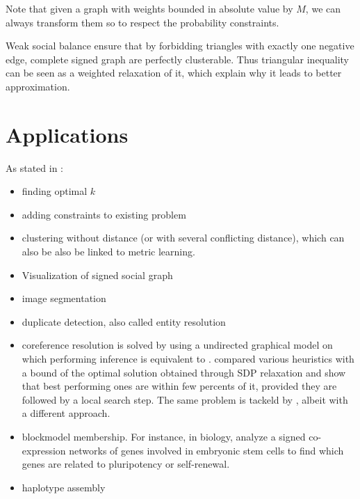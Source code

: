 Note that given a graph with weights bounded in absolute value by $M$, we can
always transform them so to respect the probability constraints.

Weak social balance ensure that by forbidding triangles with exactly one
negative edge, complete signed graph are perfectly
clusterable\autocite{davis1967clustering}. Thus triangular inequality can be
seen as a weighted relaxation of it, which explain why it leads to better
approximation.

\section{Applications}
\label{sec:appli}
As stated in \autocite[Section 5]{Demaine2006}:
\begin{itemize}
	\item finding optimal $k$
	\item adding constraints to existing problem
	\item clustering without distance (or with several conflicting
		distance), which can also be also be linked to metric learning.
	\item Visualization of signed social graph \autocite{Luca10}
	\item image segmentation \autocites{Bagon2011}{Kim2011}
	\item duplicate detection, also called entity resolution \autocite{DeDup09}
	\item coreference resolution is solved by \textcite[Section
		2.3]{graphicalCoreference04} using a undirected graphical model on
		which performing inference is equivalent to \pcc{}.
		\Textcite{Elsner2009} compared various heuristics with a bound of the
		optimal solution obtained through SDP relaxation and show that best
		performing ones are within few percents of it, provided they are
		followed by a local search step. The same problem is tackeld
		by \textcite{Chatel14}, albeit with a different approach.
	\item blockmodel membership. For instance, in biology,
		\textcite{Mason2009} analyze a signed co-expression networks of genes
		involved in embryonic stem cells to find which genes are related to
		pluripotency or self-renewal.
	\item haplotype assembly \autocite{Das2015}
\end{itemize}


